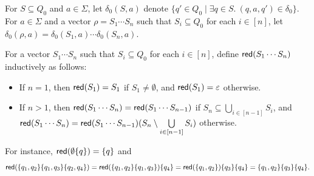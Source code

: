 For $S \subseteq Q_0$ and $a \in \Sigma$, let $\delta_0(S,a)$ denote $\{q' \in Q_0 \mid \exists q \in S.\ (q,a,q') \in \delta_0 \}$. For $a \in \Sigma$ and a vector $\rho = S_1 \cdots S_n$ such that $S_i \subseteq Q_0$ for each $i \in [n]$, let $\delta_0(\rho,a)=\delta_0(S_1,a) \cdots \delta_0(S_n, a)$.

For a vector $S_1 \cdots S_n$ such that $S_i \subseteq Q_0$ for each $i \in [n]$, define $\mathsf{red}(S_1 \cdots S_n)$ inductively as follows:  
\begin{itemize}
\item If $n = 1$, then $\mathsf{red}(S_1)=S_1$ if $S_1 \neq \emptyset$, and $\mathsf{red}(S_1)=\varepsilon$ otherwise.
% 
\item If $n > 1$, then $\mathsf{red}(S_1 \cdots S_n)=\mathsf{red}(S_1 \cdots S_{n-1})$ if $S_n \subseteq \bigcup \limits_{i \in [n-1]} S_i$, and $\mathsf{red}(S_1 \cdots S_n) = \mathsf{red}(S_1 \cdots S_{n-1}) (S_n \setminus \bigcup \limits_{i \in [n-1]} S_i) $ otherwise.
\end{itemize}
For instance, 
%
$\mathsf{red}(\emptyset\{q\})=\{q\}$ and 
$$\mathsf{red}(\{q_1, q_2\} \{q_1, q_3\} \{q_2, q_4\})=\mathsf{red}(\{q_1,q_2\}\{q_1,q_3\})\{q_4\}= \mathsf{red}(\{q_1,q_2\}) \{q_3\} \{q_4\} = \{q_1,q_2\} \{q_3\}\{q_4\}.$$

